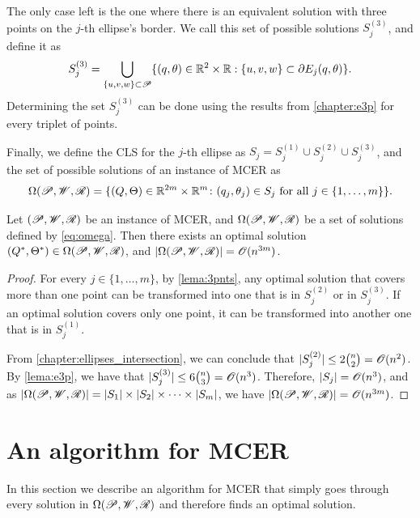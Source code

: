 The only case left is the one where there is an equivalent solution with three points on the $j$-th ellipse's border. We call this set of possible solutions $S_j^{(3)}$, and define it as
\begin{equation}
	S_j^{(3)} = \bigcup_{\{u, v, w\} \subset \mathscr{P}} \{(q, \theta)\in \mathbb{R}^2\times\mathbb{R}: \{u, v, w\} \subset \partial E_j(q, \theta)\}.
\end{equation}
Determining the set $S_j^{(3)}$ can be done using the results from \autoref{chapter:e3p} for every triplet of points.

Finally, we define the CLS for the $j$-th ellipse as $S_j = S_j^{(1)} \cup S_j^{(2)} \cup S_j^{(3)}$, and the set of possible solutions of an instance of MCER as
\begin{equation}\label{eq:omega}
\Omega(\mathscr{P}, \mathscr{W}, \mathscr{R}) = \{(Q, \Theta)\in \mathbb{R}^{2m}\times\mathbb{R}^m \colon (q_j, \theta_j) \in S_j \textnormal{ for all } j\in\{1, \dots, m\}\}.
\end{equation}

\begin{theorem}\label{th:mcer}
	Let $(\mathscr{P}, \mathscr{W}, \mathscr{R})$ be an instance of MCER, and $\Omega(\mathscr{P}, \mathscr{W}, \mathscr{R})$ be a set of solutions defined by \autoref{eq:omega}. Then there exists an optimal solution $(Q^*, \Theta^*) \in \Omega(\mathscr{P}, \mathscr{W}, \mathscr{R})$, and $|\Omega(\mathscr{P}, \mathscr{W}, \mathscr{R})|=\mathscr{O}(n^{3m})$.	
\end{theorem}

\begin{proof}
	For every $j \in \{1, \dots, m\}$, by \autoref{lema:3pnts}, any optimal solution that covers more than one point can be transformed into one that is in $S_j^{(2)}$ or in $S_j^{(3)}$.
	If an optimal solution covers only one point, it can be transformed into another one that is in $S_j^{(1)}$.
	
	From \autoref{chapter:ellipses_intersection}, we can conclude that $|S_j^{(2)}|\le 2\binom{n}{2} = \mathscr{O}(n^2)$.
	By \autoref{lema:e3p}, we have that $|S_j^{(3)}| \le 6\binom{n}{3} = \mathscr{O}(n^3)$.
	Therefore, $|S_j|=\mathscr{O}(n^3)$, and as $|\Omega(\mathscr{P}, \mathscr{W}, \mathscr{R})|= |S_1|\times|S_2|\times\dots\times|S_m|$, we have $|\Omega(\mathscr{P}, \mathscr{W}, \mathscr{R})|=\mathscr{O}(n^{3m})$.
\end{proof}

\section{An algorithm for MCER}

In this section we describe an algorithm for MCER that simply goes through every solution in $\Omega(\mathscr{P}, \mathscr{W}, \mathscr{R})$ and therefore finds an optimal solution.

